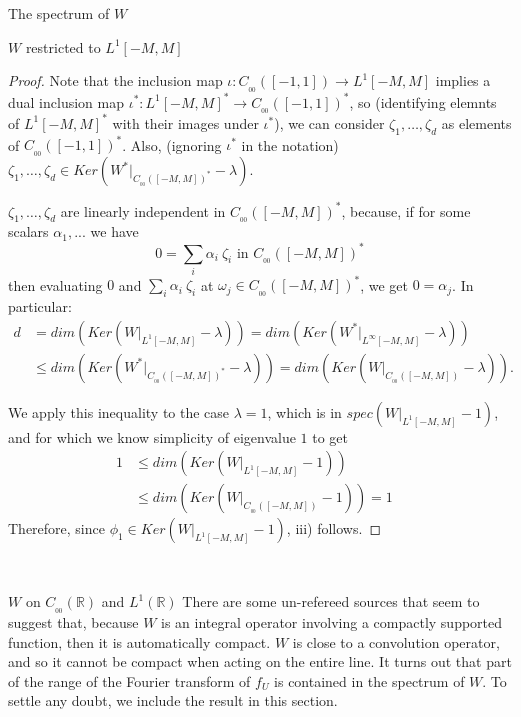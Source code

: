 \documentclass[12pt]{article}
\begin{document}
\begin{section}{The spectrum of $W$ }
\begin{subsection}{$W$ restricted to $L^1[-M,M]$ }
\begin{proof}
Note that the inclusion map $\iota: C_{_{00}}([-1,1]) \longrightarrow L^1[-M,M]$ implies a dual inclusion map $\iota^*: L^1[-M,M]^*  \longrightarrow C_{_{00}}([-1,1])^*$, so (identifying elemnts of $L^1[-M,M]^*$ with their images under $\iota^*$), we can consider $\zeta_1,\dots,\zeta_d$ as elements of $C_{_{00}}([-1,1])^*$. Also, (ignoring $\iota^*$ in the notation) $\zeta_1,\dots,\zeta_d \in Ker\left( W^*\Big|_{C_{_{00}}([-M,M])^*} - \lambda \right)$.

$\zeta_1,\dots,\zeta_d $ are linearly independent in $C_{_{00}}([-M,M])^*$, because, if for some scalars $\alpha_1,...$ we have
$$
0 = \sum_i \alpha_i \ \zeta_i \text{ in } C_{_{00}}([-M,M])^*
$$
then evaluating $0$ and $\sum_i \alpha_i \ \zeta_i$ at $\omega_j \in C_{_{00}}([-M,M])^*$, we get $0 = \alpha_j$. In particular:
\begin{align*}
d &= dim \left( Ker \left( W\Big|_{L^1[-M,M]} - \lambda \right) \right) 
= dim \left( Ker \left( W^* \Big|_{L^{\infty}[-M,M]} - \lambda \right) \right)  &\\
&\le dim \left( Ker \left( W^* \Big|_{C_{_{00}}([-M,M])^*} - \lambda \right) \right) 
= dim \left( Ker \left( W\Big|_{C_{_{00}}([-M,M])} - \lambda \right) \right). &
\end{align*}

We apply this inequality to the case $\lambda = 1$, which is in $spec\left( W\Big|_{L^1[-M,M]} - 1 \right)$, and for which we know simplicity of eigenvalue $1$ to get
\begin{align*}
1 &\le dim \left( Ker \left( W\Big|_{L^1[-M,M]} - 1 \right) \right)  &\\
&\le dim \left( Ker \left( W\Big|_{C_{_{00}}([-M,M])} - 1 \right) \right) = 1 &
\end{align*}
Therefore, since $\phi_1 \in Ker \left( W\Big|_{L^1[-M,M]} - 1 \right)$, iii) follows.
\end{proof}



\end{subsection}

\  
\  



\begin{subsection}{$W$ on $C_{_{0\!0}}(\mathbb{R})$ and $L^1(\mathbb{R})$}
There are some un-refereed sources that seem to suggest that, because $W$ is an integral operator involving a compactly supported function, then it is automatically compact. $W$ is close to a convolution operator, and so it cannot be compact when acting on the entire line. It turns out that part of the range of the Fourier transform of $f_U$ is contained in the spectrum of $W$. To settle any doubt, we include the result in this section.  


\end{subsection}
\end{section}
\end{document}
